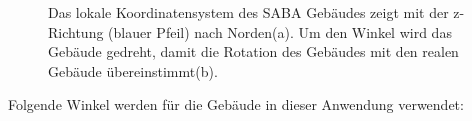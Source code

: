 \begin{figure}[H]
    \centering
    \qquad
    \caption{Das lokale Koordinatensystem des SABA Gebäudes zeigt mit der z-Richtung (blauer Pfeil) nach Norden(a). Um den Winkel \textalpha  wird das Gebäude gedreht, damit die Rotation des Gebäudes mit den realen Gebäude übereinstimmt(b).}%
    \label{fig:umsetzung-gps-rotation-saba}
\end{figure}

Folgende Winkel werden für die Gebäude in dieser Anwendung verwendet:

